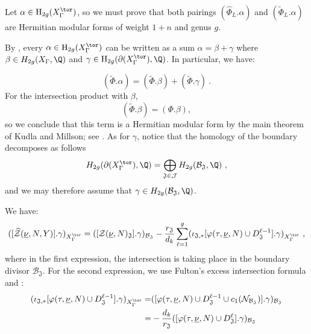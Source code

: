 \documentclass[11pt,letterpaper,english]{amsart}
\numberwithin{equation}{subsection}
\numberwithin{equation}{section}
\newcommand\cB{{\mathcal B}}
\newcommand\cJ{{\mathcal J}}
\newcommand\cN{{\mathcal N}}
\newcommand\cZ{{\mathcal Z}}
\newcommand\fJ{{\mathfrak J}}
\theoremstyle{plain}
\theoremstyle{remark}
\newtheorem{remarque}[theorem]{Remark}
\begin{document}

Let $\alpha \in \mathrm{H}_{2g}(X_\Gamma^{\tor})$, so we must prove that both pairings $(\widehat{\Phi}_L.\alpha)$ and $(\widetilde{\Phi}_L.\alpha)$ are Hermitian modular forms of weight $1+n$ and genus $g$.


By , every $\alpha\in \mathrm{H}_{2g}(X_\Gamma^{\tor})$ can be written as a sum $\alpha=\beta+\gamma$ where $\beta\in H_{2g}(X_\Gamma,\Q)$ and   $\gamma\in \mathrm{H}_{2g}(\partial(X_\Gamma^{\tor}),\Q)$. In particular, we have: 

\[\left(\widetilde \Phi.\alpha\right)=\left(\widetilde \Phi.\beta\right)+\left(\widetilde \Phi.\gamma\right)~.\]
For the intersection product with $\beta$,
\[\left(\widetilde \Phi.\beta\right)=\left(\Phi.\beta\right),\]
so we conclude that this term is a Hermitian modular form by the main theorem of Kudla and Millson; see \cite{kudla-millson}. As for $\gamma$, notice that the homology of the boundary decomposes as follows
\[H_{2g}(\partial(X_\Gamma^{\tor}),\Q)=\bigoplus _{\fJ\in \cJ}H_{2g}(\cB_\fJ,\Q)~,\]
and we may therefore assume that $\gamma\in H_{2g}(\cB_\fJ,\Q)$.

We have:
\[([\widehat{\cZ}(\underline{\nu},N,Y)].\gamma)_{X^{\tor}_{\Gamma}}=([\cZ(\underline{\nu},N)_{\fJ}].\gamma)_{\cB_\fJ}-\frac{r_\fJ}{d_k}\sum_{\ell=1}^g(\iota_{\fJ,*}[\varphi(\tau,\underline{\nu},N)\cup D_{\fJ}^{\ell-1}].\gamma)_{X_\Gamma^{\tor}}~,\]
where in the first expression, the intersection is taking place in the boundary divisor $\cB_\fJ$. For the second expression, we use Fulton's excess intersection formula and :
\begin{align*}(\iota_{\fJ,*}[\varphi(\tau,\underline{\nu},N)\cup D_{\fJ}^{\ell-1}].\gamma)_{X_\Gamma^{\tor}}=&([\varphi(\tau,\underline{\nu},N)\cup D_{\fJ}^{\ell-1}\cup c_1(\cN_{\cB_\fJ})].\gamma)_{\cB_\fJ}\\
=&-\frac{d_k}{r_\fJ}([\varphi(\tau,\underline{\nu},N)\cup D_{\fJ}^{\ell}].\gamma)_{\cB_\fJ}
\end{align*}
\end{document}
